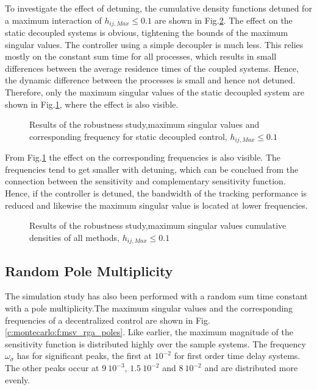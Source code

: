 To investigate the effect of detuning, the cumulative density functions detuned for a maximum interaction of $h_{ij,Max} \leq 0.1$ are shown in Fig.\ref{c:montecarlo:f:mimo_cdf_detuned_tsum}. The effect on the static decoupled systems is obvious, tightening the bounds of the maximum singular values. The controller using a simple decoupler is much less. This relies mostly on the constant sum time for all processes, which results in small differences between the average residence times of the coupled systems. Hence, the dynamic difference between the processes is small and hence not detuned. Therefore, only the maximum singular values of the static decoupled system are shown in Fig.\ref{c:montecarlo:f:msv_a_detuned_tsum}, where the effect is also visible.

\begin{figure}[H]\centering

\caption{Results of the robustness study,maximum singular values and corresponding frequency for static decoupled control, $h_{ij,Max} \leq 0.1$}
\label{c:montecarlo:f:msv_a_detuned_tsum}
\end{figure}

From Fig.\ref{c:montecarlo:f:msv_a_detuned_tsum} the effect on the corresponding frequencies is also visible. The frequencies tend to get smaller with detuning, which can be conclued from the connection between the sensitivity and complementary sensitivity function. Hence, if the controller is detuned, the bandwidth of the tracking performance is reduced and likewise the maximum singular value is located at lower frequencies.

\begin{figure}[H]\centering

\caption{Results of the robustness study,maximum singular values cumulative densities of all methods, $h_{ij,Max} \leq 0.1$}
\label{c:montecarlo:f:mimo_cdf_detuned_tsum}
\end{figure}

\newpage
\subsection{Random Pole Multiplicity}
\label{c:montecarlo:ss:poles_mimo}

The simulation study has also been performed with a random sum time constant with a pole multiplicity.The maximum singular values and the corresponding frequencies of a decentralized control are shown in Fig.\ref{c:montecarlo:f:msv_rga_poles}. Like earlier, the maximum magnitude of the sensitivity function is distributed highly over the sample systems. The frequency $\omega_{\overline{\sigma}}$ has for significant peaks, the first at $10^{-2}$ for first order time delay systems. The other peaks occur at $9~10^{-3}$, $1.5~10^{-2}$ and $8~10^{-2}$ and are distributed more evenly. 

